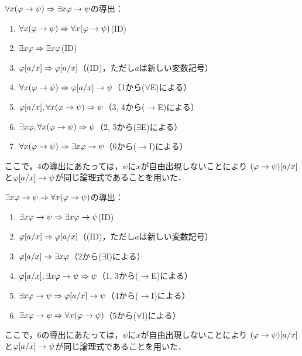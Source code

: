 \(\forall x \paren{\varphi \to \psi} \sequent \exists x \varphi \to \psi\)の導出：
\begin{enumerate}
	\item \(\forall x \paren{\varphi \to \psi} \sequent \forall x \paren{\varphi \to \psi}\)\quad (ID)
	\item \(\exists x \varphi \Rightarrow \exists x \varphi\)\quad (ID)
	\item \(\subst{\varphi}{a/x} \sequent \subst{\varphi}{a/x}\)\quad （(ID)，ただし\(a\)は新しい変数記号）
	\item \(\forall x \paren{\varphi \to \psi} \sequent \subst{\varphi}{a/x} \to \psi\)\quad （1から(\(\forall\)E)による）
	\item \(\subst{\varphi}{a/x}, \forall x \paren{\varphi \to \psi} \sequent \psi\)\quad （3, 4から(\(\to\)E)による）
	\item \(\exists x \varphi, \forall x \paren{\varphi \to \psi} \sequent \psi\)\quad （2, 5から(\(\exists\)E)による）
	\item \(\forall x \paren{\varphi \to \psi} \sequent \exists x \varphi \to \psi\)\quad （6から(\(\to\)I)による）
\end{enumerate}
ここで，4の導出にあたっては，\(\psi\)に\(x\)が自由出現しないことにより
\(\subst{\paren{\varphi \to \psi}}{a/x}\)と\(\subst{\varphi}{a/x} \to \psi\)が同じ論理式であることを用いた．

\(\exists x \varphi \to \psi \sequent \forall x \paren{\varphi \to \psi}\)の導出：
\begin{enumerate}
	\item \(\exists x \varphi \to \psi \Rightarrow \exists x \varphi \to \psi\)\quad (ID)
	\item \(\subst{\varphi}{a/x} \sequent \subst{\varphi}{a/x}\)\quad （(ID)，ただし\(a\)は新しい変数記号）
	\item \(\subst{\varphi}{a/x} \sequent \exists x \varphi\)\quad （2から(\(\exists\)I)による）
	\item \(\subst{\varphi}{a/x}, \exists x \varphi \to \psi \sequent \psi\)\quad （1, 3から(\(\to\)E)による）
	\item \(\exists x \varphi \to \psi \sequent \subst{\varphi}{a/x} \to \psi\)\quad （4から(\(\to\)I)による）
	\item \(\exists x \varphi \to \psi \sequent \forall x \paren{\varphi \to \psi}\)\quad （5から(\(\forall\)I)による）
\end{enumerate}
ここで，6の導出にあたっては，\(\psi\)に\(x\)が自由出現しないことにより
\(\subst{\paren{\varphi \to \psi}}{a/x}\)と\(\subst{\varphi}{a/x} \to \psi\)が同じ論理式であることを用いた．

